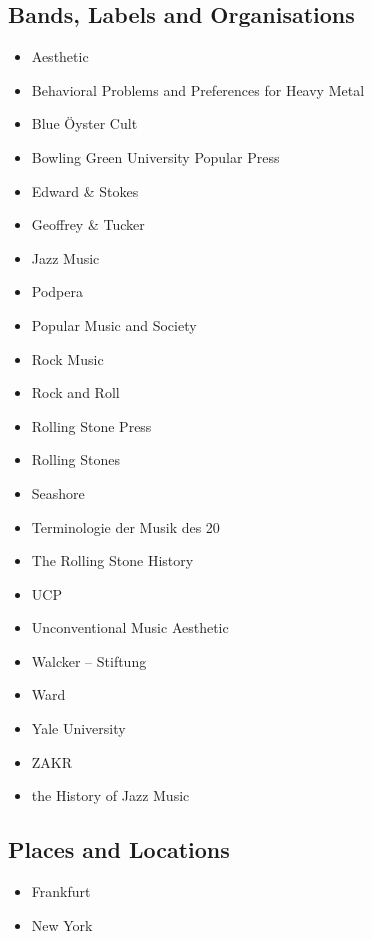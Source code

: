 \documentclass[12pt,a4paper]{article}
\begin{document}
\subsection{Bands, Labels and Organisations}
\begin{itemize}
  \item Aesthetic
  \item Behavioral Problems and Preferences for Heavy Metal
  \item Blue Öyster Cult
  \item Bowling Green University Popular Press
  \item Edward \& Stokes
  \item Geoffrey \& Tucker
  \item Jazz Music
  \item Podpera
  \item Popular Music and Society
  \item Rock Music
  \item Rock and Roll
  \item Rolling Stone Press
  \item Rolling Stones
  \item Seashore
  \item Terminologie der Musik des 20
  \item The Rolling Stone History
  \item UCP
  \item Unconventional Music Aesthetic
  \item Walcker -- Stiftung
  \item Ward
  \item Yale University
  \item ZAKR
  \item the History of Jazz Music
\end{itemize}

\subsection{Places and Locations}
\begin{itemize}
  \item Frankfurt
  \item New York
\end{itemize}
\end{document}
